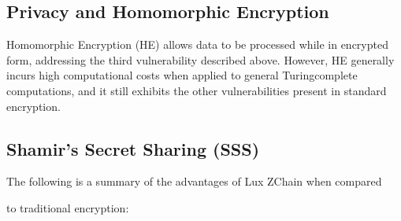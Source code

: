 \documentclass[11pt]{article}
\begin{document}
\subsection{Privacy and Homomorphic Encryption}

Homomorphic Encryption (HE) allows data to be processed while in encrypted form, addressing the third vulnerability described above. However, HE generally incurs high computational costs when applied to general Turingcomplete computations, and it still exhibits the other vulnerabilities present in standard encryption.


\subsection{Shamir's Secret Sharing (SSS)}

The following is a summary of the advantages of Lux ZChain when compared


to traditional encryption:
\end{document}
